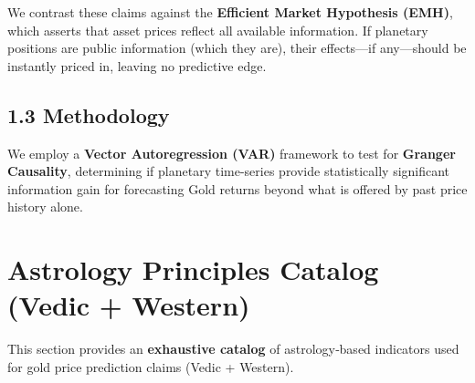 \documentclass[
  11pt,
  a4paper,
  oneside,
  openany]{report}
\begin{document}
We contrast these claims against the \textbf{Efficient Market Hypothesis
(EMH)}, which asserts that asset prices reflect all available
information. If planetary positions are public information (which they
are), their effects---if any---should be instantly priced in, leaving no
predictive edge.

\section{1.3 Methodology}\label{methodology-2}

We employ a \textbf{Vector Autoregression (VAR)} framework to test for
\textbf{Granger Causality}, determining if planetary time-series provide
statistically significant information gain for forecasting Gold returns
beyond what is offered by past price history alone.

\chapter{Astrology Principles Catalog (Vedic +
Western)}\label{astrology-principles-catalog-vedic-western}

This section provides an \textbf{exhaustive catalog} of astrology‑based
indicators used for gold price prediction claims (Vedic + Western).
\end{document}
